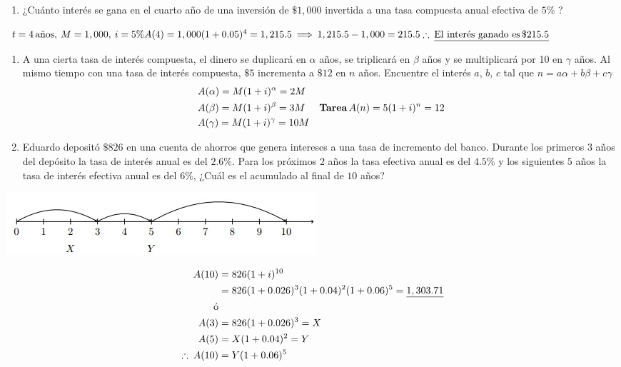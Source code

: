\documentclass[
]{book}
\providecommand{\tightlist}{%
  \setlength{\itemsep}{0pt}\setlength{\parskip}{0pt}}
\theoremstyle{definition}
\theoremstyle{definition}
\theoremstyle{definition}
\theoremstyle{definition}
\theoremstyle{remark}
\begin{document}
\begin{enumerate}
\def\labelenumi{\arabic{enumi}.}
\setcounter{enumi}{2}
\tightlist
\item
  ¿Cuánto interés se gana en el cuarto año de una inversión de \(\$1,000\) invertida a una tasa compuesta anual efectiva de \(5\%\) ?
\end{enumerate}

\(t = 4\, \text{años}, \: M=1,000,\: i = 5\% \\ A(4) = 1,000(1+0.05)^4 = 1,215.5 \: \Longrightarrow \: 1,215.5 - 1,000 = 215.5\\ \therefore \: \underline{\text{El interés ganado es} \, \$ 215.5}\)

\begin{enumerate}
\def\labelenumi{\arabic{enumi}.}
\setcounter{enumi}{3}
\item
  A una cierta tasa de interés compuesta, el dinero se duplicará en \(\alpha\) años, se triplicará en \(\beta\) años y se multiplicará por 10 en \(\gamma\) años. Al mismo tiempo con una tasa de interés compuesta, \(\$5\) incrementa a \(\$12\) en \(n\) años. Encuentre el interés \(a\), \(b\), \(c\) tal que \(n=a\alpha + b\beta + c\gamma\)
  \begin{align*}
  & A(\alpha) = M(1 + i)^{\alpha} = 2M  & \hfill \hfill \\
  & A(\beta) = M(1+i)^{\beta} = 3M  & \textbf{Tarea} \, A(n) = 5 (1+i)^n = 12 \\
  & A(\gamma) = M(1+i)^{\gamma} = 10M
  \end{align*}
\item
  Eduardo depositó \(\$ 826\) en una cuenta de ahorros que genera intereses a una tasa de incremento del banco. Durante los primeros \(3\) años del depósito la tasa de interés anual es del \(2.6\%\). Para los próximos \(2\) años la tasa efectiva anual es del \(4.5\%\) y los siguientes \(5\) años la tasa de interés efectiva anual es del \(6\%\), ¿Cuál es el acumulado al final de \(10\) años?
\end{enumerate}

\includegraphics{images/4.jpg}

\begin{align*}
A(10) &= 826 (1+i)^{10} \\
      &= 826 (1+0.026)^3(1+0.04)^2(1+0.06)^5 = \underline{1,303.71}\\
\hfill \text{ó} \\
A(3) &= 826(1+0.026)^3=X\\
A(5) &=X(1+0.04)^2 = Y\\
\therefore \: A(10) &=Y(1+0.06)^5
\end{align*}
\end{document}
